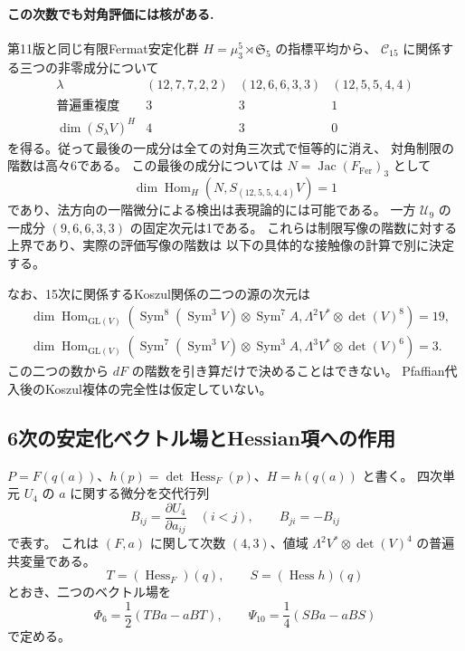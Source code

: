 \documentclass[a4paper,11pt]{ltjsarticle}
\theoremstyle{definition}
\begin{document}
\paragraph{この次数でも対角評価には核がある.}
第11版と同じ有限Fermat安定化群
$H=\mu_3^5\rtimes\mathfrak S_5$ の指標平均から、
$\mathcal C_{15}$ に関係する三つの非零成分について
\[
\begin{array}{c|ccc}
 \lambda&(12,7,7,2,2)&(12,6,6,3,3)&(12,5,5,4,4)\\\hline
 \text{普遍重複度}&3&3&1\\
 \dim(S_\lambda V)^H&4&3&0
\end{array}
\]
を得る。従って最後の一成分は全ての対角三次式で恒等的に消え、
対角制限の階数は高々6である。
この最後の成分については
$N=\operatorname{Jac}(F_{\mathrm{Fer}})_3$ として
\[
 \dim\operatorname{Hom}_H(N,S_{(12,5,5,4,4)}V)=1
\]
であり、法方向の一階微分による検出は表現論的には可能である。
一方 $\mathcal U_9$ の一成分 $(9,6,6,3,3)$ の固定次元は1である。
これらは制限写像の階数に対する上界であり、実際の評価写像の階数は
以下の具体的な接触像の計算で別に決定する。

なお、15次に関係するKoszul関係の二つの源の次元は
\[
\begin{split}
 &\dim\operatorname{Hom}_{\mathrm{GL}(V)}
 \left(\operatorname{Sym}^{8}(\operatorname{Sym}^3V)
       \otimes\operatorname{Sym}^{7}A,
       \Lambda^2V^*\otimes\det(V)^8\right)=19,\\
 &\dim\operatorname{Hom}_{\mathrm{GL}(V)}
 \left(\operatorname{Sym}^{7}(\operatorname{Sym}^3V)
       \otimes\operatorname{Sym}^{3}A,
       \Lambda^3V^*\otimes\det(V)^6\right)=3.
\end{split}
\]
この二つの数から $dF$ の階数を引き算だけで決めることはできない。
Pfaffian代入後のKoszul複体の完全性は仮定していない。

\subsection{6次の安定化ベクトル場とHessian項への作用}
\label{subsec:v12-sixth-stabilizer}

$P=F(q(a))$、$h(p)=\det\operatorname{Hess}_F(p)$、$H=h(q(a))$ と書く。
四次単元 $U_4$ の $a$ に関する微分を交代行列
\[
 B_{ij}=\frac{\partial U_4}{\partial a_{ij}}\quad(i<j),\qquad
 B_{ji}=-B_{ij}
\]
で表す。
これは $(F,a)$ に関して次数 $(4,3)$、値域
$\Lambda^2V^*\otimes\det(V)^4$ の普遍共変量である。
\[
 T=(\operatorname{Hess}_F)(q),\qquad
 S=(\operatorname{Hess}h)(q)
\]
とおき、二つのベクトル場を
\begin{equation}\label{eq:v12-sixth-tenth-fields}
 \Phi_6=\frac12(TBa-aBT),\qquad
 \Psi_{10}=\frac14(SBa-aBS)
\end{equation}
で定める。
\end{document}
